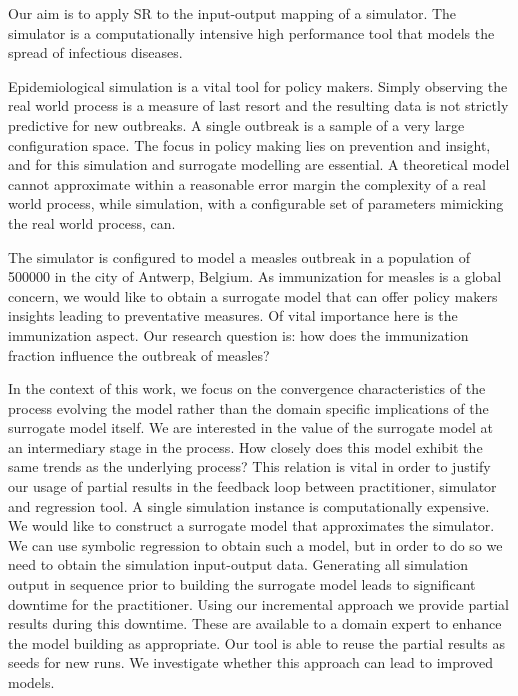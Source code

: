 Our aim is to apply SR to the input-output mapping of a simulator. The simulator is a computationally intensive high performance tool \citep{stride} that models the spread of infectious diseases.
 
Epidemiological simulation is a vital tool for policy makers. Simply observing the real world process is a measure of last resort and the resulting data is not strictly predictive for new outbreaks. A single outbreak is a sample of a very large configuration space. The focus in policy making lies on prevention and insight, and for this simulation and surrogate modelling are essential. A theoretical model cannot approximate within a reasonable error margin the complexity of a real world process, while simulation, with a configurable set of parameters mimicking the real world process, can.

The simulator is configured to model a measles outbreak in a population of 500000 in the city of Antwerp, Belgium. As immunization for measles is a global concern, we would like to obtain a surrogate model that can offer policy makers insights leading to preventative measures. Of vital importance here is the immunization aspect. Our research question is: how does the immunization fraction influence the outbreak of measles?

In the context of this work, we focus on the convergence characteristics of the process evolving the model rather than the domain specific implications of the surrogate model itself. We are interested in the value of the surrogate model at an intermediary stage in the process. How closely does this model exhibit the same trends as the underlying process? This relation is vital in order to justify our usage of partial results in the feedback loop between practitioner, simulator and regression tool. A single simulation instance is computationally expensive. We would like to construct a surrogate model that approximates the simulator. We can use symbolic regression to obtain such a model, but in order to do so we need to obtain the simulation input-output data.  Generating all simulation output in sequence prior to building the surrogate model leads to significant downtime for the practitioner. Using our incremental approach we provide partial results during this downtime. These are available to a domain expert to enhance the model building as appropriate. Our tool is able to reuse the partial results as seeds for new runs. We investigate whether this approach can lead to improved models.

